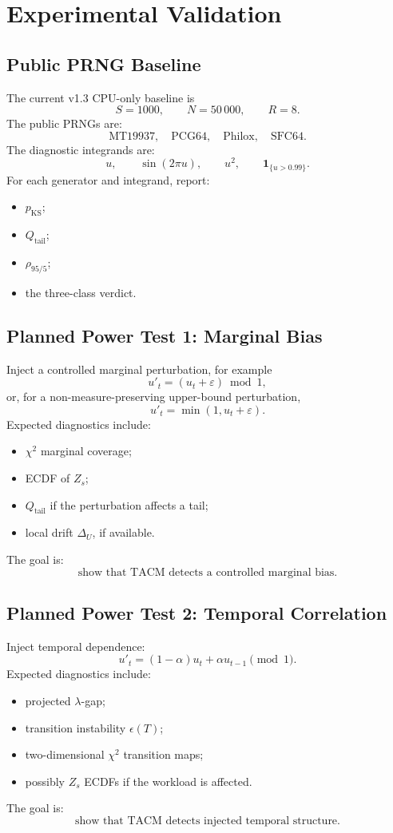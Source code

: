 \documentclass[11pt,a4paper]{article}
\newcommand{\Qtail}{Q_{\mathrm{tail}}}
\newcommand{\KS}{\mathrm{KS}}
\begin{document}
\section{Experimental Validation}

\subsection{Public PRNG Baseline}

The current v1.3 CPU-only baseline is
\[
S=1000,\qquad N=50\,000,\qquad R=8.
\]
The public PRNGs are:
\[
\text{MT19937},\quad \text{PCG64},\quad \text{Philox},\quad \text{SFC64}.
\]
The diagnostic integrands are:
\[
u,\qquad
\sin(2\pi u),\qquad
u^2,\qquad
\mathbf 1_{\{u>0.99\}}.
\]
For each generator and integrand, report:
\begin{itemize}
  \item $p_{\KS}$;
  \item $\Qtail$;
  \item $\rho_{95/5}$;
  \item the three-class verdict.
\end{itemize}

\subsection{Planned Power Test 1: Marginal Bias}

Inject a controlled marginal perturbation, for example
\[
u'_t=(u_t+\varepsilon)\bmod1,
\]
or, for a non-measure-preserving upper-bound perturbation,
\[
u'_t=\min(1,u_t+\varepsilon).
\]
Expected diagnostics include:
\begin{itemize}
  \item $\chi^2$ marginal coverage;
  \item ECDF of $Z_s$;
  \item $\Qtail$ if the perturbation affects a tail;
  \item local drift $\Delta_U$, if available.
\end{itemize}
The goal is:
\[
\boxed{
\text{show that TACM detects a controlled marginal bias.}
}
\]

\subsection{Planned Power Test 2: Temporal Correlation}

Inject temporal dependence:
\[
u'_t=(1-\alpha)u_t+\alpha u_{t-1}\pmod1.
\]
Expected diagnostics include:
\begin{itemize}
  \item projected $\lambda$-gap;
  \item transition instability $\epsilon(T)$;
  \item two-dimensional $\chi^2$ transition maps;
  \item possibly $Z_s$ ECDFs if the workload is affected.
\end{itemize}
The goal is:
\[
\boxed{
\text{show that TACM detects injected temporal structure.}
}
\]
\end{document}
